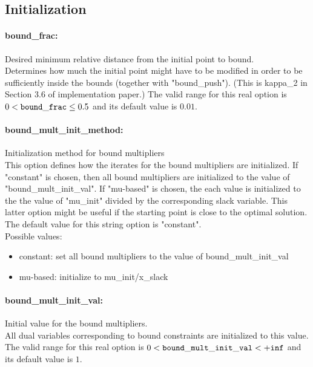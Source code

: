 \subsection{Initialization}
\label{sec:Initialization}
\paragraph{bound\_frac:}\label{sec:bound_frac} Desired minimum relative distance from the initial point to bound. $\;$ \\
 Determines how much the initial point might have
to be modified in order to be sufficiently inside
the bounds (together with "bound\_push").  (This
is kappa\_2 in Section 3.6 of implementation
paper.) The valid range for this real option is 
$0 <  {\tt bound\_frac } \le 0.5$
and its default value is $0.01$.


\paragraph{bound\_mult\_init\_method:}\label{sec:bound_mult_init_method} Initialization method for bound multipliers $\;$ \\
 This option defines how the iterates for the
bound multipliers are initialized.  If "constant"
is chosen, then all bound multipliers are
initialized to the value of
"bound\_mult\_init\_val".  If "mu-based" is
chosen, the each value is initialized to the the
value of "mu\_init" divided by the corresponding
slack variable.  This latter option might be
useful if the starting point is close to the
optimal solution.
The default value for this string option is "constant".
\\ 
Possible values:
\begin{itemize}
   \item constant: set all bound multipliers to the value of
bound\_mult\_init\_val
   \item mu-based: initialize to mu\_init/x\_slack
\end{itemize}

\paragraph{bound\_mult\_init\_val:}\label{sec:bound_mult_init_val} Initial value for the bound multipliers. $\;$ \\
 All dual variables corresponding to bound
constraints are initialized to this value. The valid range for this real option is 
$0 <  {\tt bound\_mult\_init\_val } <  {\tt +inf}$
and its default value is $1$.


